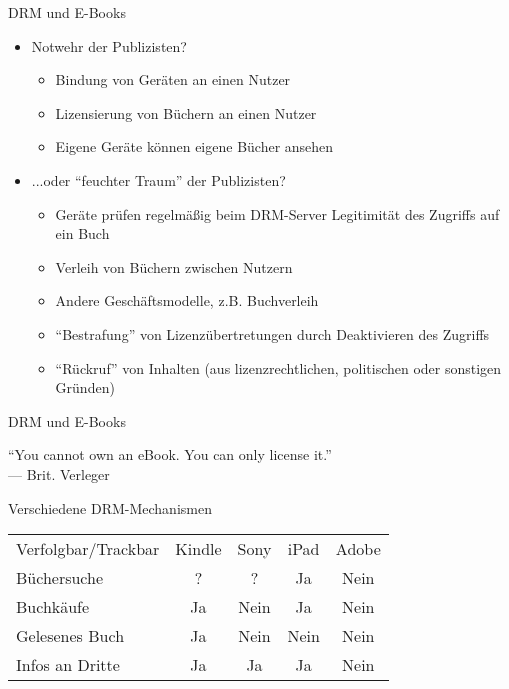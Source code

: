\begin{frame}{DRM und E-Books}
	\begin{itemize}
		\item Notwehr der Publizisten?
		\begin{itemize}
			\item Bindung von Geräten an einen Nutzer
			\item Lizensierung von Büchern an einen Nutzer
			\item Eigene Geräte können eigene Bücher ansehen
		\end{itemize}
		\item<2-> ...oder "`feuchter Traum"' der Publizisten?
		\begin{itemize}
			\item<2-> Geräte prüfen regelmäßig beim DRM-Server Legitimität des Zugriffs auf ein Buch
			\item<2-> Verleih von Büchern zwischen Nutzern
			\item<2-> Andere Geschäftsmodelle, z.B. Buchverleih
			\item<2-> "`Bestrafung"' von Lizenzübertretungen durch Deaktivieren des Zugriffs
			\item<2-> "`Rückruf"' von Inhalten (aus lizenzrechtlichen, politischen oder sonstigen Gründen)
		\end{itemize}
	\end{itemize}
\end{frame}

\begin{frame}{DRM und E-Books}
	\begin{block}{ }
		"`You cannot own an eBook. You can only license it."' \\
		--- Brit. Verleger
	\end{block}
\end{frame}


\newcommand{\cellyes}{\cellcolor{red}Ja}
\newcommand{\cellunknown}{\cellcolor{yellow}?}
\newcommand{\cellno}{\cellcolor{green}Nein}

\begin{frame}{Verschiedene DRM-Mechanismen}
	\begin{tabular}{lcccc}
	Verfolgbar/Trackbar & Kindle & Sony & iPad & Adobe \\
	Büchersuche & \cellunknown & \cellunknown & \cellyes & \cellno \\
	Buchkäufe & \cellyes & \cellno & \cellyes & \cellno \\
	Gelesenes Buch & \cellyes & \cellno & \cellno & \cellno \\
	Infos an Dritte & \cellyes & \cellyes & \cellyes & \cellno \\
	\end{tabular}
\end{frame}

